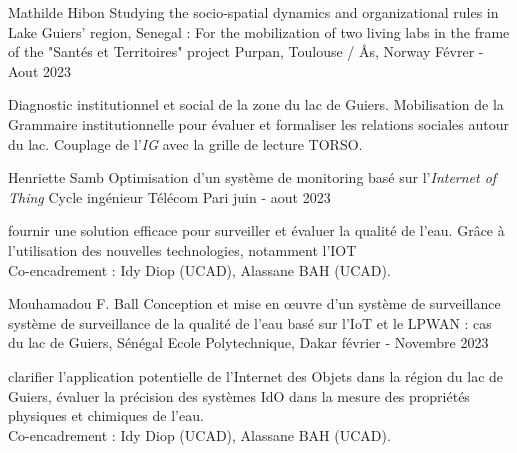 \begin{cventries}
    \cventry
        {Mathilde Hibon} %
        {Studying the socio-spatial dynamics and organizational rules in Lake Guiers' region, Senegal : For the mobilization of two living labs in the frame of the "Santés et Territoires" project} %
        {Purpan, Toulouse /  Ås, Norway} %
        {Févrer - Aout 2023} %
        {
        \begin{cvitems} %
          Diagnostic institutionnel et social de la zone du lac de Guiers. Mobilisation de la Grammaire institutionnelle pour évaluer et formaliser les relations sociales autour du lac. Couplage de l'\textit{IG} avec la grille de lecture TORSO. 
        \end{cvitems}
        }


    \cventry
        {Henriette Samb} %
        {Optimisation d’un système de monitoring basé sur l’\textit{Internet of Thing}} %
        {Cycle ingénieur Télécom Pari } %
        {juin - aout 2023} %
        {
        \begin{cvitems} %
          fournir une solution efficace pour surveiller et évaluer la qualité de l’eau. Grâce à l’utilisation des nouvelles technologies, notamment l’IOT\\
            Co-encadrement : Idy Diop (UCAD), Alassane BAH (UCAD).
        \end{cvitems}
        }


    \cventry
        {Mouhamadou F. Ball} %
        {Conception et mise en œuvre d'un système de surveillance système de surveillance de la qualité de l'eau basé sur l'IoT et le LPWAN : cas du lac de Guiers, Sénégal} %
        {Ecole Polytechnique, Dakar} %
        {février - Novembre 2023} %
        {
        \begin{cvitems} %
          clarifier l'application potentielle de l'Internet des Objets dans la région du lac de Guiers, évaluer la précision des systèmes IdO dans la mesure des propriétés physiques et chimiques de l'eau.\\
            Co-encadrement : Idy Diop (UCAD), Alassane BAH (UCAD).
        \end{cvitems}
        }



\end{cventries}
